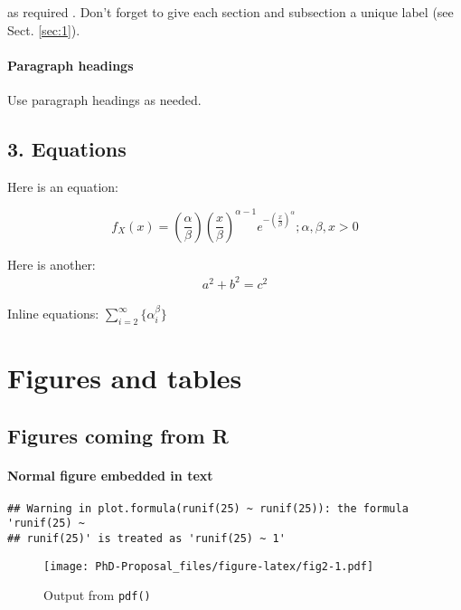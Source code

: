 \documentclass[useAMS,usenatbib,referee]{biom}
\begin{document}
as required \citep{hoerl1970ridge, zou2005regularization}. Don't forget
to give each section and subsection a unique label (see Sect.
\ref{sec:1}).

\hypertarget{paragraph-headings}{%
\paragraph{Paragraph headings}\label{paragraph-headings}}

Use paragraph headings as needed.

\hypertarget{equations}{%
\subsection{3. Equations}\label{equations}}

Here is an equation:

\[ f_{X}(x) = \left(\frac{\alpha}{\beta}\right)\left(\frac{x}{\beta}\right)^{\alpha-1}e^{-\left(\frac{x}{\beta}\right)^{\alpha}}; \alpha,\beta,x > 0 \]

Here is another: \begin{align}
a^2+b^2=c^2
\end{align}

Inline equations: \(\sum_{i = 2}^\infty\{\alpha_i^\beta\}\)

\hypertarget{s:fig}{%
\section{Figures and tables}\label{s:fig}}

\hypertarget{figures-coming-from-r}{%
\subsection{Figures coming from R}\label{figures-coming-from-r}}

\hypertarget{normal-figure-embedded-in-text}{%
\paragraph{Normal figure embedded in
text}\label{normal-figure-embedded-in-text}}

\begin{verbatim}
## Warning in plot.formula(runif(25) ~ runif(25)): the formula 'runif(25) ~
## runif(25)' is treated as 'runif(25) ~ 1'
\end{verbatim}

\begin{figure}
\centering
\texttt{[image: PhD-Proposal\_files/figure-latex/fig2-1.pdf]}
\caption{Output from \texttt{pdf()}}
\end{figure}
\end{document}
